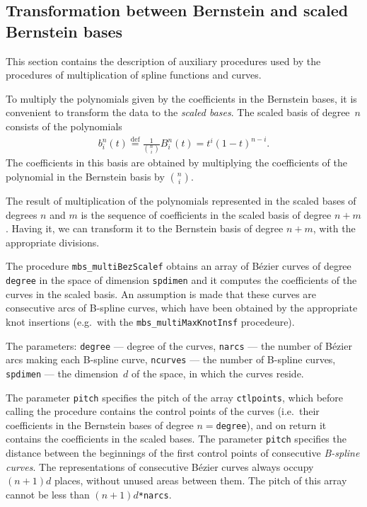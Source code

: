 \newpage
\subsection{Transformation between Bernstein and scaled Bernstein bases}

This section contains the description of auxiliary procedures
used by the procedures of multiplication of spline functions and curves.

To multiply the polynomials given by the coefficients in the
Bernstein bases, it is convenient to transform the data to the
\emph{scaled bases}.
The scaled basis of degree~$n$ consists of the polynomials
\begin{align}
  b^n_i(t) \stackrel{\mathrm{def}}{=} \frac{1}{\binom{n}{i}}B^n_i(t) =
  t^i(1-t)^{n-i}.
\end{align}
The coefficients in this basis are obtained by multiplying the
coefficients of the polynomial in the Bernstein basis by
$\binom{n}{i}$.

The result of multiplication of the polynomials represented
in the scaled bases of degrees $n$ and $m$ is the sequence of coefficients
in the scaled basis of degree $n+m$. Having it, we can transform it
to the Bernstein basis of degree $n+m$, with the appropriate divisions.

\vspace{\bigskipamount}
The procedure \texttt{mbs\_multiBezScalef} obtains an array of B\'{e}zier
curves of degree \texttt{degree} in the space of dimension \texttt{spdimen}
and it computes the coefficients of the curves in the scaled basis.
An assumption is made that these curves are consecutive arcs of
B-spline curves, which have been obtained by the appropriate knot insertions
(e.g.\ with the \texttt{mbs\_multiMaxKnotInsf} procedeure).

\begin{sloppypar}
The parameters: \texttt{degree} --- degree of the curves, \texttt{narcs} --- the
number of B\'{e}zier arcs making each B-spline curve,
\texttt{ncurves} --- the number of B-spline curves, \texttt{spdimen} ---
the dimension~$d$ of the space, in which the curves reside.
\end{sloppypar}

The parameter \texttt{pitch} specifies the pitch of the array \texttt{ctlpoints},
which before calling the procedure contains the control points of
the curves (i.e.\ their coefficients in the Bernstein bases
of degree $n={}$\texttt{degree}),
and on return it contains the coefficients in the scaled bases.
The parameter \texttt{pitch} specifies the distance between the beginnings
of the first control points of consecutive \emph{B-spline curves}.
The representations of consecutive B\'{e}zier curves always occupy $(n+1)d$
places, without unused areas between them. The pitch of this array
cannot be less than $(n+1)d$\texttt{*narcs}.

